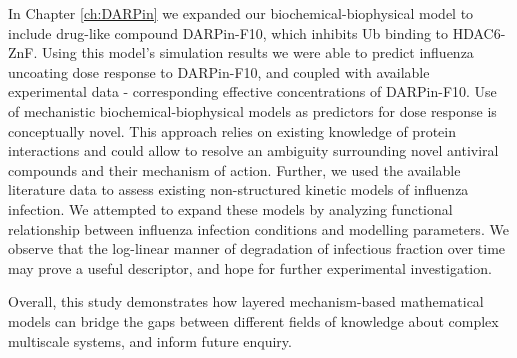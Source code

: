 In Chapter \ref{ch:DARPin} we expanded our biochemical-biophysical model to include drug-like compound DARPin-F10, which inhibits Ub binding to HDAC6-ZnF. Using this model's simulation results we were able to predict influenza uncoating dose response to DARPin-F10, and coupled with available experimental data - corresponding effective concentrations of DARPin-F10. Use of mechanistic biochemical-biophysical models as predictors for dose response is conceptually novel. This approach relies on existing knowledge of protein interactions and could allow to resolve an ambiguity surrounding novel antiviral compounds and their mechanism of action. Further, we used the available literature data \cite{rudiger2019multiscale, schulze2009infection} to assess existing non-structured kinetic models of influenza infection. We attempted to expand these models by analyzing functional relationship between influenza infection conditions and modelling parameters. We observe that the log-linear manner of degradation of infectious fraction over time may prove a useful descriptor, and hope for further experimental investigation. 

Overall, this study demonstrates how layered mechanism-based mathematical models can bridge the gaps between different fields of knowledge about complex multiscale systems, and inform future enquiry.